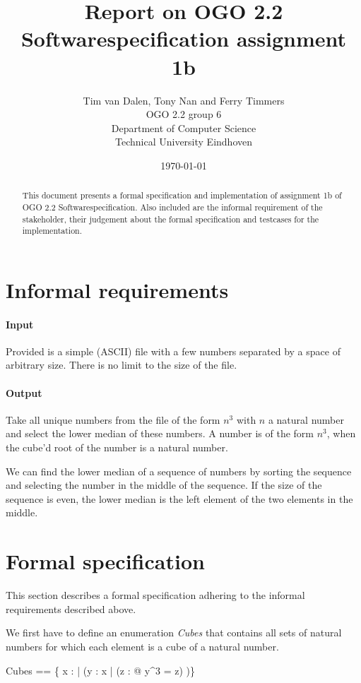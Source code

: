 \documentclass[12pt]{article}
\title{Report on OGO 2.2 Softwarespecification assignment 1b}
\author{
        Tim van Dalen, Tony Nan and Ferry Timmers\\ OGO 2.2 group 6 \\
                Department of Computer Science\\
        Technical University Eindhoven\\
}
\date{\today}
\begin{document}
\maketitle

\begin{abstract}
This document presents a formal specification and implementation of assignment 1b of OGO 2.2 Softwarespecification. Also included are the informal requirement of the stakeholder, their judgement about the formal specification and testcases for the implementation.
\end{abstract}

\section{Informal requirements}
\paragraph{Input} Provided is a simple (ASCII) file with a few numbers separated by a space of arbitrary size. There is no limit to the size of the file.

\paragraph{Output} Take all unique numbers from the file of the form $n^3$ with $n$ a natural number and select the lower median of these numbers. A number is of the form $n^3$, when the cube'd root of the number is a natural number.

We can find the lower median of a sequence of numbers by sorting the sequence and selecting the number in the middle of the sequence. If the size of the sequence is even, the lower median is the left element of the two elements in the middle.

\section{Formal specification}

This section describes a formal specification adhering to the informal requirements described above.

We first have to define an enumeration \textit{Cubes} that contains all sets of natural numbers for which each element is a cube of a natural number.
\begin{axdef}
Cubes == \{ x : \power \nat | (\forall y : x | (\exists z : \nat @ y^3 = z) )\}
\end{axdef}
\end{document}
